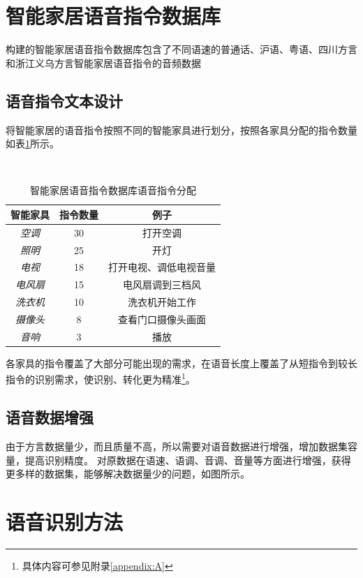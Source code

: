 \documentclass[lang=cn,cite=super]{elegantpaper}
\begin{document}
\section{智能家居语音指令数据库}
构建的智能家居语音指令数据库包含了不同语速的普通话、沪语、粤语、四川方言和浙江义乌方言智能家居语音指令的音频数据
\subsection{语音指令文本设计}

将智能家居的语音指令按照不同的智能家具进行划分，按照各家具分配的指令数量如表\ref{tab:1}所示。
\begin{table}[h]
    \caption{\label{tab:1} 智能家居语音指令数据库语音指令分配}\
    \begin{center}
        \begin{tabular}{ccc}
            \hline
            \textbf{智能家具} & \textbf{指令数量} & \textbf{例子} \\
            \hline \hline
            \textit{空调} & 30 & 打开空调 \\
            \textit{照明} & 25 & 开灯 \\
            \textit{电视} & 18 & 打开电视、调低电视音量 \\
            \textit{电风扇} & 15 & 电风扇调到三档风 \\
            \textit{洗衣机} & 10 & 洗衣机开始工作 \\
            \textit{摄像头} & 8 & 查看门口摄像头画面 \\
            \textit{音响} & 3 & 播放\\
            \hline
        \end{tabular}
    \end{center}
\end{table}

各家具的指令覆盖了大部分可能出现的需求，在语音长度上覆盖了从短指令到较长指令的识别需求，使识别、转化更为精准\footnote{具体内容可参见附录\ref{appendix:A}}。

\subsection{语音数据增强}
由于方言数据量少，而且质量不高，所以需要对语音数据进行增强，增加数据集容量，提高识别精度。
对原数据在语速、语调、音调、音量等方面进行增强，获得更多样的数据集，能够解决数据量少的问题，如图所示。

\section{语音识别方法}
\end{document}

